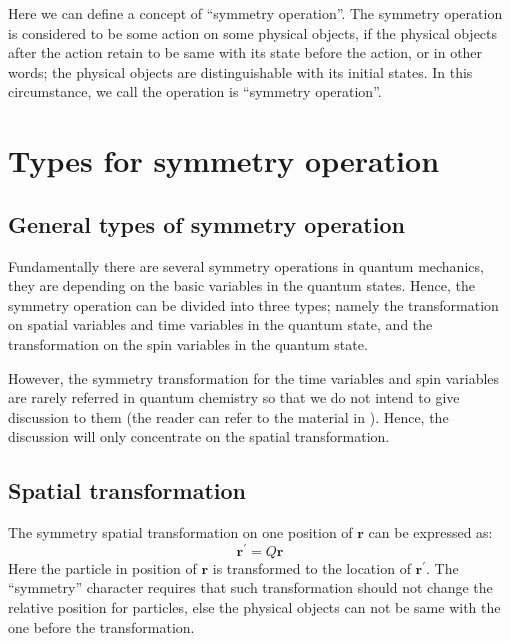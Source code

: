 Here we can define a concept of ``symmetry operation''. The symmetry
operation is considered to be some action on some physical objects,
if the physical objects after the action retain to be same with its
state before the action, or in other words; the physical objects are
distinguishable with its initial states. In this circumstance, we
call the operation is ``symmetry operation''.

\section{Types for symmetry operation}
%
%
%
%
\subsection{General types of symmetry operation}
%
%
%
Fundamentally there are several symmetry operations in quantum
mechanics, they are depending on the basic variables in the quantum
states. Hence, the symmetry operation can be divided into three
types; namely the transformation on spatial variables and time
variables in the quantum state, and the transformation on the spin
variables in the quantum state.

However, the symmetry transformation for the time variables and spin
variables are rarely referred in quantum chemistry so that we do not
intend to give discussion to them (the reader can refer to the
material in \cite{XingLinKe}). Hence, the discussion will only
concentrate on the spatial transformation.


\subsection{Spatial transformation}
%
%
The symmetry spatial transformation on one position of $\bm{r}$ can
be expressed as:
\begin{equation}\label{SYMMETRY_IN_QMeq:1}
\bm{r^{'}} = Q\bm{r}
\end{equation}
Here the particle in position of $\bm{r}$ is transformed to the
location of $\bm{r^{'}}$. The ``symmetry'' character requires that
such transformation should not change the relative position for
particles, else the physical objects can not be same with the one
before the transformation.

